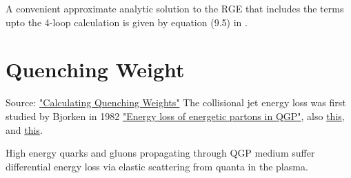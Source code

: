 \documentclass[11pt,onecolumn]{article}
\begin{document}
A convenient approximate analytic solution to the RGE that includes the terms upto the 4-loop calculation is given by equation (9.5) in \cite{vanRitbergen:1997va}.


\section{Quenching Weight}
Source: \href{https://arxiv.org/pdf/hep-ph/0302184.pdf}{"Calculating Quenching Weights"} 
The collisional jet energy loss was first studied by Bjorken in 1982 \href{https://lss.fnal.gov/archive/1982/pub/Pub-82-059-T.pdf}{"Energy loss of energetic partons in QGP"}, also \href{https://arxiv.org/pdf/hep-ph/0209038.pdf}{this}, and \href{https://doi.org/10.1103/PhysRevD.25.746}{this}. 

High energy quarks and gluons propagating through QGP medium suffer differential energy loss via elastic scattering from quanta in the plasma. 


\newpage


\end{document}
